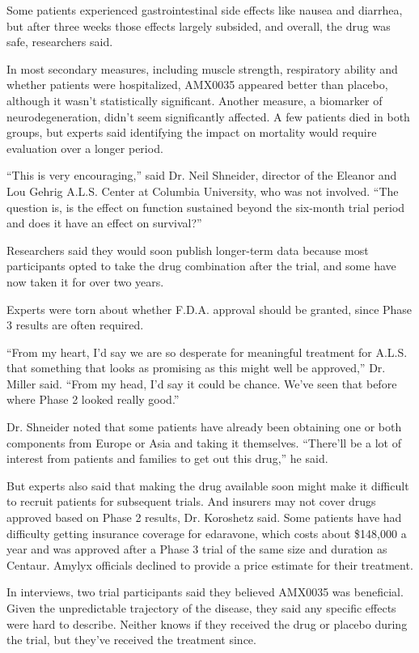 Some patients experienced gastrointestinal side effects like nausea and
diarrhea, but after three weeks those effects largely subsided, and
overall, the drug was safe, researchers said.

In most secondary measures, including muscle strength, respiratory
ability and whether patients were hospitalized, AMX0035 appeared better
than placebo, although it wasn't statistically significant. Another
measure, a biomarker of neurodegeneration, didn't seem significantly
affected. A few patients died in both groups, but experts said
identifying the impact on mortality would require evaluation over a
longer period.

``This is very encouraging,'' said Dr. Neil Shneider, director of the
Eleanor and Lou Gehrig A.L.S. Center at Columbia University, who was not
involved. ``The question is, is the effect on function sustained beyond
the six-month trial period and does it have an effect on survival?''

Researchers said they would soon publish longer-term data because most
participants opted to take the drug combination after the trial, and
some have now taken it for over two years.

Experts were torn about whether F.D.A. approval should be granted, since
Phase 3 results are often required.

``From my heart, I'd say we are so desperate for meaningful treatment
for A.L.S. that something that looks as promising as this might well be
approved,'' Dr. Miller said. ``From my head, I'd say it could be chance.
We've seen that before where Phase 2 looked really good.''

Dr. Shneider noted that some patients have already been obtaining one or
both components from Europe or Asia and taking it themselves. ``There'll
be a lot of interest from patients and families to get out this drug,''
he said.

But experts also said that making the drug available soon might make it
difficult to recruit patients for subsequent trials. And insurers may
not cover drugs approved based on Phase 2 results, Dr. Koroshetz said.
Some patients have had difficulty getting insurance coverage for
edaravone, which costs about \$148,000 a year and was approved after a
Phase 3 trial of the same size and duration as Centaur. Amylyx officials
declined to provide a price estimate for their treatment.

In interviews, two trial participants said they believed AMX0035 was
beneficial. Given the unpredictable trajectory of the disease, they said
any specific effects were hard to describe. Neither knows if they
received the drug or placebo during the trial, but they've received the
treatment since.


